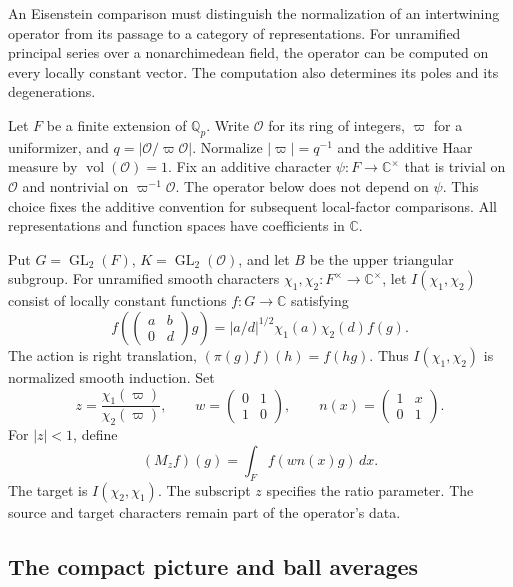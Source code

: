 An Eisenstein comparison must distinguish the normalization of an
intertwining operator from its passage to a category of representations.
For unramified principal series over a nonarchimedean field, the operator
can be computed on every locally constant vector.
The computation also determines its poles and its degenerations.

Let $F$ be a finite extension of $\mathbb Q_p$.
Write $\mathcal O$ for its ring of integers, $\varpi$ for a uniformizer,
and $q=|\mathcal O/\varpi\mathcal O|$.
Normalize $|\varpi|=q^{-1}$ and the additive Haar measure by
$\operatorname{vol}(\mathcal O)=1$.
Fix an additive character $\psi:F\to\mathbb C^\times$ that is trivial on
$\mathcal O$ and nontrivial on $\varpi^{-1}\mathcal O$.
The operator below does not depend on $\psi$.
This choice fixes the additive convention for subsequent local-factor comparisons.
All representations and function spaces have coefficients in $\mathbb C$.

Put $G=\operatorname{GL}_2(F)$, $K=\operatorname{GL}_2(\mathcal O)$,
and let $B$ be the upper triangular subgroup.
For unramified smooth characters $\chi_1,\chi_2:F^\times\to\mathbb C^\times$,
let $I(\chi_1,\chi_2)$ consist of locally constant functions $f:G\to\mathbb C$
satisfying
\[
 f\left(\begin{pmatrix}a&b\\0&d\end{pmatrix}g\right)
 =|a/d|^{1/2}\chi_1(a)\chi_2(d)f(g).
\]
The action is right translation, $(\pi(g)f)(h)=f(hg)$.
Thus $I(\chi_1,\chi_2)$ is normalized smooth induction.
Set
\[
 z=\frac{\chi_1(\varpi)}{\chi_2(\varpi)},\qquad
 w=\begin{pmatrix}0&1\\1&0\end{pmatrix},\qquad
 n(x)=\begin{pmatrix}1&x\\0&1\end{pmatrix}.
\]
For $|z|<1$, define
\begin{equation}
\label{v4-arith:eis:raw-intertwiner}
 (M_zf)(g)=\int_F f(wn(x)g)\,dx.
\end{equation}
The target is $I(\chi_2,\chi_1)$.
The subscript $z$ specifies the ratio parameter.
The source and target characters remain part of the operator's data.

\subsection{The compact picture and ball averages}

